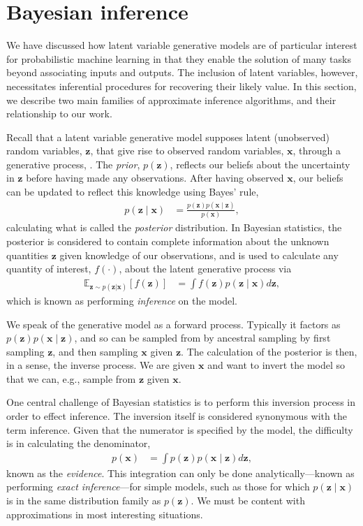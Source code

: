 \section{Bayesian inference}
We have discussed how latent variable generative models are of particular interest for probabilistic machine learning in that they enable the solution of many tasks beyond associating inputs and outputs. The inclusion of latent variables, however, necessitates inferential procedures for recovering their likely value. In this section, we describe two main families of approximate inference algorithms, and their relationship to our work.

Recall that a latent variable generative model supposes latent (unobserved) random variables, $\mathbf{z}$, that give rise to observed random variables, $\mathbf{x}$, through a generative process, \fixedmodel. The \emph{prior}, $p(\mathbf{z})$, reflects our beliefs about the uncertainty in $\mathbf{z}$ before having made any observations. After having observed $\mathbf{x}$, our beliefs can be updated to reflect this knowledge using Bayes' rule, 
\begin{align*}
	p(\mathbf{z}\mid\mathbf{x}) &= \frac{p(\mathbf{z})p(\mathbf{x}\mid\mathbf{z})}{p(\mathbf{x})},
\end{align*}
calculating what is called the \emph{posterior} distribution. In Bayesian statistics, the posterior is considered to contain complete information about the unknown quantities $\mathbf{z}$ given knowledge of our observations, and is used to calculate any quantity of interest, $f(\cdot)$, about the latent generative process via
\begin{align}\label{eq:bayes-inference}
	\mathbb{E}_{\mathbf{z}\sim p(\mathbf{z}|\mathbf{x})}\left[f(\mathbf{z})\right] &= \int f(\mathbf{z})p(\mathbf{z}\mid\mathbf{x})d\mathbf{z},
\end{align}
which is known as performing \emph{inference} on the model.

We speak of the generative model as a forward process. Typically it factors as $p(\mathbf{z})p(\mathbf{x}\mid\mathbf{z})$, and so can be sampled from by ancestral sampling by first sampling $\mathbf{z}$, and then sampling $\mathbf{x}$ given $\mathbf{z}$. The calculation of the posterior is then, in a sense, the inverse process. We are given $\mathbf{x}$ and want to invert the model so that we can, e.g., sample from $\mathbf{z}$ given $\mathbf{x}$.

One central challenge of Bayesian statistics is to perform this inversion process in order to effect inference. The inversion itself is considered synonymous with the term inference. Given that the numerator is specified by the model, the difficulty is in calculating the denominator,
\begin{align*}
	p(\mathbf{x}) &= \int p(\mathbf{z})p(\mathbf{x}\mid\mathbf{z})d\mathbf{z},
\end{align*}
known as the \emph{evidence}. This integration can only be done analytically---known as performing \emph{exact inference}---for simple models, such as those for which $p(\mathbf{z}\mid\mathbf{x})$ is in the same distribution family as $p(\mathbf{z})$. We must be content with approximations in most interesting situations.


